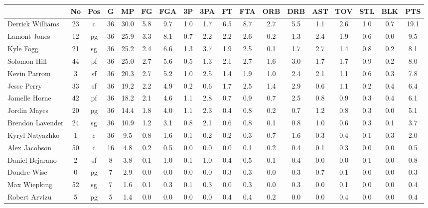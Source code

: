 \documentclass[10pt,letterpaper]{article}
\begin{document}
\begin{table}[ht]
\begin{center}
\begin{tabular}{lccccccccccccccccc}
  \hline
 & No & Pos & G & MP & FG & FGA & 3P & 3PA & FT & FTA & ORB & DRB & AST & TOV & STL & BLK & PTS \\ 
  \hline
Derrick Williams & 23 & c & 36 & 30.0 & 5.8 & 9.7 & 1.0 & 1.7 & 6.5 & 8.7 & 2.7 & 5.5 & 1.1 & 2.6 & 1.0 & 0.7 & 19.1 \\ 
  Lamont Jones & 12 & pg & 36 & 25.9 & 3.3 & 8.1 & 0.7 & 2.2 & 2.2 & 2.6 & 0.2 & 1.3 & 2.4 & 1.9 & 0.6 & 0.0 & 9.5 \\ 
  Kyle Fogg & 21 & sg & 36 & 25.2 & 2.4 & 6.6 & 1.3 & 3.7 & 1.9 & 2.5 & 0.1 & 1.7 & 2.7 & 1.4 & 0.8 & 0.2 & 8.1 \\ 
  Solomon Hill & 44 & pf & 36 & 25.0 & 2.7 & 5.6 & 0.5 & 1.3 & 2.1 & 2.7 & 1.6 & 3.0 & 1.7 & 1.7 & 0.9 & 0.2 & 8.0 \\ 
  Kevin Parrom & 3 & sf & 36 & 20.3 & 2.7 & 5.2 & 1.0 & 2.5 & 1.4 & 1.9 & 1.0 & 2.4 & 2.1 & 1.1 & 0.6 & 0.3 & 7.8 \\ 
  Jesse Perry & 33 & sf & 36 & 19.2 & 2.2 & 4.9 & 0.2 & 0.6 & 1.7 & 2.5 & 1.4 & 2.9 & 0.6 & 1.1 & 0.2 & 0.4 & 6.4 \\ 
  Jamelle Horne & 42 & pf & 36 & 18.2 & 2.1 & 4.6 & 1.1 & 2.8 & 0.7 & 0.9 & 0.7 & 2.5 & 0.8 & 0.9 & 0.3 & 0.4 & 6.1 \\ 
  Jordin Mayes & 20 & pg & 36 & 14.4 & 1.8 & 4.0 & 1.1 & 2.3 & 0.4 & 0.8 & 0.2 & 0.7 & 1.2 & 0.8 & 0.3 & 0.0 & 5.1 \\ 
  Brendon Lavender & 24 & sg & 36 & 10.9 & 1.2 & 3.1 & 0.8 & 2.1 & 0.6 & 0.8 & 0.1 & 0.8 & 1.0 & 0.6 & 0.3 & 0.1 & 3.7 \\ 
  Kyryl Natyazhko & 1 & c & 36 & 9.5 & 0.8 & 1.6 & 0.1 & 0.2 & 0.2 & 0.3 & 0.7 & 1.6 & 0.3 & 0.4 & 0.1 & 0.3 & 2.0 \\ 
  Alex Jacobson & 50 & c & 16 & 4.8 & 0.2 & 0.5 & 0.0 & 0.0 & 0.0 & 0.1 & 0.2 & 0.4 & 0.1 & 0.3 & 0.0 & 0.0 & 0.5 \\ 
  Daniel Bejarano & 2 & sf & 8 & 3.8 & 0.1 & 1.0 & 0.1 & 1.0 & 0.4 & 0.5 & 0.1 & 0.4 & 0.0 & 0.0 & 0.1 & 0.0 & 0.8 \\ 
  Dondre Wise & 0 & pg & 7 & 2.9 & 0.0 & 0.0 & 0.0 & 0.0 & 0.3 & 0.3 & 0.0 & 0.3 & 0.7 & 0.1 & 0.0 & 0.0 & 0.3 \\ 
  Max Wiepking & 52 & sg & 7 & 1.6 & 0.1 & 0.3 & 0.1 & 0.3 & 0.0 & 0.3 & 0.0 & 0.3 & 0.0 & 0.1 & 0.0 & 0.0 & 0.4 \\ 
  Robert Arvizu & 5 & pg & 5 & 1.4 & 0.0 & 0.0 & 0.0 & 0.0 & 0.4 & 0.4 & 0.2 & 0.0 & 0.0 & 0.4 & 0.0 & 0.0 & 0.4 \\ 
   \hline
\end{tabular}
\end{center}
\end{table}
\end{document}
